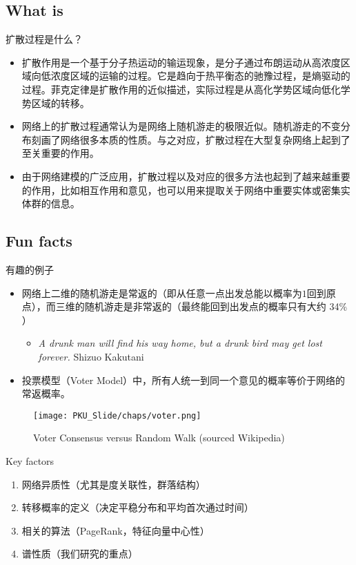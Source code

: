 \subsection{What is}

\begin{frame}{扩散过程是什么？}

\begin{itemize}
    \item 扩散作用是一个基于分子热运动的输运现象，是分子通过布朗运动从高浓度区域向低浓度区域的运输的过程。它是趋向于热平衡态的驰豫过程，是熵驱动的过程。菲克定律是扩散作用的近似描述，实际过程是从高化学势区域向低化学势区域的转移。
    \item 网络上的扩散过程通常认为是网络上随机游走的极限近似。随机游走的不变分布刻画了网络很多本质的性质。与之对应，扩散过程在大型复杂网络上起到了至关重要的作用。
    \item 由于网络建模的广泛应用，扩散过程以及对应的很多方法也起到了越来越重要的作用，比如相互作用和意见，也可以用来提取关于网络中重要实体或密集实体群的信息。
\end{itemize}

\end{frame}

\subsection{Fun facts}

\begin{frame}{有趣的例子}
\begin{itemize}
    \item 网络上二维的随机游走是常返的（即从任意一点出发总能以概率为$1$回到原点），而三维的随机游走是非常返的（最终能回到出发点的概率只有大约 34\% ）\begin{itemize}
        \item \textit{A drunk man will find his way home, but a drunk bird may get lost forever.} Shizuo Kakutani
    \end{itemize}
    \item 投票模型（Voter Model）中，所有人统一到同一个意见的概率等价于网络的常返概率。
\end{itemize}
\begin{figure}
    \centering
    \texttt{[image: PKU\_Slide/chaps/voter.png]}
    \caption{Voter Consensus versus Random Walk (sourced Wikipedia)}
\end{figure}
\end{frame}

\begin{frame}{Key factors}

\begin{enumerate}
    \item 网络异质性（尤其是度关联性，群落结构）
    \item 转移概率的定义（决定平稳分布和平均首次通过时间）
    \item 相关的算法（PageRank，特征向量中心性）
    \item 谱性质（我们研究的重点）
\end{enumerate}
    
\end{frame}